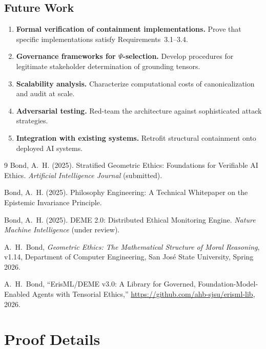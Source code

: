 \documentclass[12pt]{article}
\theoremstyle{definition}
\begin{document}
\subsection{Future Work}

\begin{enumerate}
    \item \textbf{Formal verification of containment implementations.} Prove that specific implementations satisfy Requirements~3.1--3.4.
    \item \textbf{Governance frameworks for $\Psi$-selection.} Develop procedures for legitimate stakeholder determination of grounding tensors.
    \item \textbf{Scalability analysis.} Characterize computational costs of canonicalization and audit at scale.
    \item \textbf{Adversarial testing.} Red-team the architecture against sophisticated attack strategies.
    \item \textbf{Integration with existing systems.} Retrofit structural containment onto deployed AI systems.
\end{enumerate}

\begin{thebibliography}{9}
Bond, A.~H. (2025). Stratified Geometric Ethics: Foundations for Verifiable AI Ethics. \textit{Artificial Intelligence Journal} (submitted).

Bond, A.~H. (2025). Philosophy Engineering: A Technical Whitepaper on the Epistemic Invariance Principle.

Bond, A.~H. (2025). DEME 2.0: Distributed Ethical Monitoring Engine. \textit{Nature Machine Intelligence} (under review).

A.~H.~Bond, \emph{Geometric Ethics: The Mathematical Structure of Moral Reasoning}, v1.14, Department of Computer Engineering, San Jos\'e State University, Spring 2026.

A.~H.~Bond, ``ErisML/DEME v3.0: A Library for Governed, Foundation-Model-Enabled Agents with Tensorial Ethics,'' \url{https://github.com/ahb-sjsu/erisml-lib}, 2026.
\end{thebibliography}

\appendix

\section{Proof Details}
\end{document}
